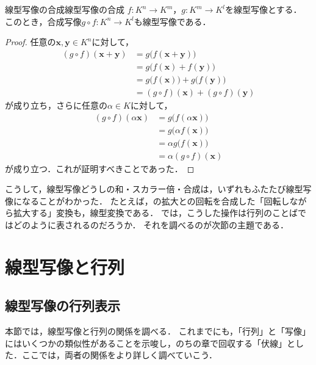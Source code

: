 \begin{prop}{線型写像の合成}{線型写像の合成}
  $f \colon K^n \to K^m$，$g \colon K^m \to K^l$を線型写像とする．
  このとき，合成写像$g \circ f \colon K^n \to K^l$も線型写像である．
\end{prop}

\begin{tleftbar}
\begin{proof}
  任意の$\bm{x}, \bm{y} \in K^n$に対して，
  \begin{align}
    (g \circ f)(\bm{x} + \bm{y}) &= g\bigl(f(\bm{x} + \bm{y})\bigr) \nonumber \\
    &= g\bigl(f(\bm{x}) + f(\bm{y})\bigr) \tag{$f$の線型性} \\
    &= g\bigl(f(\bm{x})\bigr) + g\bigl(f(\bm{y})\bigr) \tag{$g$の線型性} \\
    &= (g \circ f)(\bm{x}) + (g \circ f)(\bm{y}) \nonumber
  \end{align}
  が成り立ち，さらに任意の$\alpha \in K$に対して，
  \begin{align}
    (g \circ f)(\alpha\bm{x}) &= g\bigl(f(\alpha\bm{x})\bigr) \nonumber \\
    &= g\bigl(\alpha f(\bm{x})\bigr) \tag{$f$の線型性} \\
    &= \alpha g\bigl(f(\bm{x})\bigr) \tag{$g$の線型性} \\
    &= \alpha(g \circ f)(\bm{x}) \nonumber
  \end{align}
  が成り立つ．これが証明すべきことであった．
\end{proof}
\end{tleftbar}

こうして，線型写像どうしの和・スカラー倍・合成は，いずれもふたたび線型写像になることがわかった．
たとえば，の拡大との回転を合成した「回転しながら拡大する」変換も，線型変換である．
では，こうした操作は行列のことばではどのように表されるのだろうか．
それを調べるのが次節の主題である．

\section{線型写像と行列}

\subsection{線型写像の行列表示}

本節では，線型写像と行列の関係を調べる．
これまでにも，「行列」と「写像」にはいくつかの類似性があることを示唆し，のちの章で回収する「伏線」とした．ここでは，両者の関係をより詳しく調べていこう．

